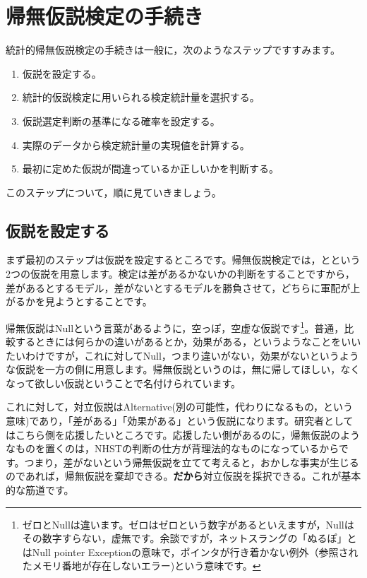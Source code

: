 \documentclass{ltjsbook}
\begin{document}
\section{帰無仮説検定の手続き}
統計的帰無仮説検定の手続きは一般に，次のようなステップですすみます。
\begin{enumerate}
	\item 仮説を設定する。
	\item 統計的仮説検定に用いられる検定統計量を選択する。
	\item 仮説選定判断の基準になる確率を設定する。
	\item 実際のデータから検定統計量の実現値を計算する。
	\item 最初に定めた仮説が間違っているか正しいかを判断する。
\end{enumerate}

このステップについて，順に見ていきましょう。
\subsection{仮説を設定する}
まず最初のステップは仮説を設定するところです。帰無仮説検定では，とという2つの仮説を用意します。検定は差があるかないかの判断をすることですから，差があるとするモデル，差がないとするモデルを勝負させて，どちらに軍配が上がるかを見ようとすることです。

帰無仮説はNullという言葉があるように，空っぽ，空虚な仮説です\footnote{ゼロとNullは違います。ゼロはゼロという数字があるといえますが，Nullはその数字すらない，虚無です。余談ですが，ネットスラングの「ぬるぽ」とはNull pointer Exceptionの意味で，ポインタが行き着かない例外（参照されたメモリ番地が存在しないエラー)という意味です。}。普通，比較するときには何らかの違いがあるとか，効果がある，というようなことをいいたいわけですが，これに対してNull，つまり違いがない，効果がないというような仮説を一方の側に用意します。帰無仮説というのは，無に帰してほしい，なくなって欲しい仮説ということで名付けられています。

これに対して，対立仮説はAlternative(別の可能性，代わりになるもの，という意味)であり，「差がある」「効果がある」という仮説になります。研究者としてはこちら側を応援したいところです。応援したい側があるのに，帰無仮説のようなものを置くのは，NHSTの判断の仕方が背理法的なものになっているからです。つまり，差がないという帰無仮説を立てて考えると，おかしな事実が生じるのであれば，帰無仮説を棄却できる。\textbf{だから}対立仮説を採択できる。これが基本的な筋道です。
\end{document}
